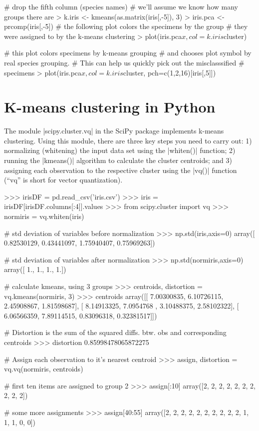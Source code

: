 \begin{R}
# drop the fifth column (species names)
# we'll assume we know how many groups there are    
> k.iris <- kmeans(as.matrix(iris[,-5]), 3)    
> iris.pca <- prcomp(iris[,-5])
# the following plot colors the specimens by the group
# they were assigned to by the k-means clustering
> plot(iris.pca$x,col=k.iris$cluster)

# this plot colors specimens by k-means grouping
# and chooses plot symbol by real species grouping.
# This can help us quickly pick out the misclasssified
# specimens
> plot(iris.pca$x, col=k.iris$cluster, pch=c(1,2,16)[iris[,5]])
\end{R}


\section{K-means clustering in Python}

The module |scipy.cluster.vq| in the SciPy package implements k-means clustering.  Using this module, there are three key steps you need to carry out: 1) normalizing (whitening) the input data set using the |whiten()| function; 2) running the |kmeans()| algorithm to calculate the cluster centroids; and 3) assigning each observation to the respective cluster using the |vq()| function (``vq'' is short for vector quantization).
%
\begin{python}
>>> irisDF = pd.read_csv('iris.csv')
>>> iris = irisDF[irisDF.columns[:4]].values
>>> from scipy.cluster import vq
>>> normiris = vq.whiten(iris)

# std deviation of variables before normalization
>>> np.std(iris,axis=0)
array([ 0.82530129,  0.43441097,  1.75940407,  0.75969263])

# std deviation of variables after normalization
>>> np.std(normiris,axis=0)
array([ 1.,  1.,  1.,  1.])

# calculate kmeans, using 3 groups
>>> centroids, distortion = vq.kmeans(normiris, 3)
>>> centroids
array([[ 7.00300835,  6.10726115,  2.45908867,  1.81598687],
       [ 8.14913325,  7.0954768 ,  3.10488375,  2.58102322],
       [ 6.06566359,  7.89114515,  0.83096318,  0.32381517]])

# Distortion is the sum of the squared diffs. btw. obs and corresponding centroids
>>> distortion
0.85998478065872275

# Assign each observation to it's nearest centroid
>>> assign, distortion = vq.vq(normiris, centroids)

# first ten items are assigned to group 2
>>> assign[:10]
array([2, 2, 2, 2, 2, 2, 2, 2, 2, 2])

# some more assignments
>>> assign[40:55]
array([2, 2, 2, 2, 2, 2, 2, 2, 2, 2, 1, 1, 1, 0, 0])
\end{python}

